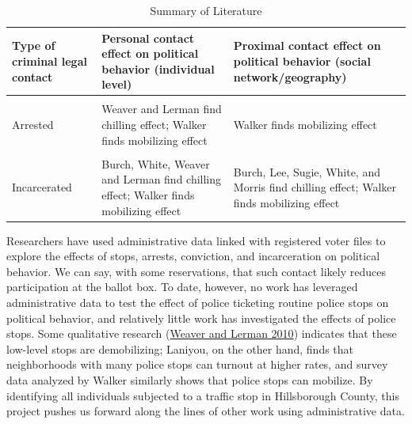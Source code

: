 \documentclass[
  12pt,
]{article}
\begin{document}
\begin{singlespace}
\begin{table}[H]

\caption{\label{tab:lit-table}\label{tab:lit-table} Summary of Literature}
\centering
\begin{tabular}[t]{>{\raggedright\arraybackslash}p{10em}>{\raggedright\arraybackslash}p{10em}>{\raggedright\arraybackslash}p{10em}}
\toprule
Type of criminal legal contact & Personal contact effect on political behavior (individual level) & Proximal contact effect on political behavior (social network/geography)\\
\midrule
\cellcolor{gray!6}{Stopped} & \cellcolor{gray!6}{Weaver and Lerman find chilling effect; Walker finds mobilizing effect} & \cellcolor{gray!6}{Laniyonu and Walker find mobilizing effect}\\
Arrested & Weaver and Lerman find chilling effect; Walker finds mobilizing effect & Walker finds mobilizing effect\\
\cellcolor{gray!6}{Convicted / Supervision} & \cellcolor{gray!6}{Burch, Weaver and Lerman find chilling effect; Walker finds mobilizing effect} & \cellcolor{gray!6}{Burch, Lee, Sugie, White, and Morris find chilling effect; Walker finds mobilizing effect}\\
Incarcerated & Burch, White, Weaver and Lerman find chilling effect; Walker finds mobilizing effect & Burch, Lee, Sugie, White, and Morris find chilling effect; Walker finds mobilizing effect\\
\bottomrule
\end{tabular}
\end{table}
\end{singlespace}

Researchers have used administrative data linked with registered voter files to explore the effects of stops, arrests, conviction, and incarceration on political behavior. We can say, with some reservations, that such contact likely reduces participation at the ballot box. To date, however, no work has leveraged administrative data to test the effect of police ticketing routine police stops on political behavior, and relatively little work has investigated the effects of police stops. Some qualitative research (\protect\hyperlink{ref-Weaver2010}{Weaver and Lerman 2010}) indicates that these low-level stops are demobilizing; Laniyou, on the other hand, finds that neighborhoods with many police stops can turnout at higher rates, and survey data analyzed by Walker similarly shows that police stops can mobilize. By identifying all individuals subjected to a traffic stop in Hillsborough County, this project pushes us forward along the lines of other work using administrative data.
\end{document}
